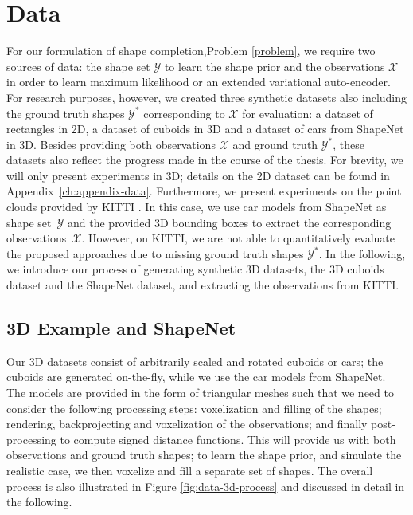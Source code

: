 \chapter{Data}
\label{ch:data}

For our formulation of shape completion,\ie Problem \ref{problem}, we require two sources
of data: the shape set $\mathcal{Y}$ to learn the shape prior and the observations $\mathcal{X}$
in order to learn maximum likelihood or an extended variational auto-encoder.
For research purposes,
however, we created three synthetic datasets also including the ground truth
shapes $\mathcal{Y}^*$ corresponding to $\mathcal{X}$ for evaluation: a
dataset of rectangles in 2D, a dataset of cuboids in 3D and
a dataset of cars from ShapeNet \cite{ChangFunkhouserGuibasSavarese:2015}
in 3D. Besides providing both observations $\mathcal{X}$ and ground
truth $\mathcal{Y}^*$, these datasets also
reflect the progress made in the course of the thesis. For brevity,
we will only present experiments in 3D; details on the
2D dataset can be found in Appendix~\ref{ch:appendix-data}.
Furthermore, we present experiments on the point clouds provided
by KITTI \cite{GeigerLenzUrtasun:2012,GeigerLenzStillerUrtasun:2013}.
In this case, we use car models from ShapeNet as shape set~$\mathcal{Y}$
and the provided 3D bounding boxes to extract the corresponding observations~$\mathcal{X}$.
However, on KITTI, we are not able to quantitatively
evaluate the proposed approaches due to missing ground truth shapes $\mathcal{Y}^*$.
In the following, we introduce our process of generating synthetic 3D datasets,
\ie the 3D cuboids dataset and the ShapeNet dataset, and extracting the observations
from KITTI.

\section{3D Example and ShapeNet}
\label{sec:data-3d}

Our 3D datasets consist of arbitrarily scaled and rotated
cuboids or cars; the cuboids are generated on-the-fly, while we use the
car models from ShapeNet.
The models are provided in the form of triangular meshes such that we
need to consider the following processing steps: voxelization and filling
of the shapes; rendering, backprojecting and voxelization of the observations;
and finally post-processing to compute signed distance functions. 
This will provide us with both observations and ground truth shapes; to
learn the shape prior, and simulate the realistic case,
we then voxelize and fill a separate set of shapes. The overall
process is also illustrated in Figure \ref{fig:data-3d-process} and discussed in
detail in the following.


